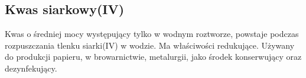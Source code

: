 \subsection{Kwas siarkowy(IV) }
Kwas o średniej mocy występujący tylko w wodnym roztworze, powstaje podczas rozpuszczania tlenku siarki(IV) w wodzie.
Ma właściwości redukujące.
Używany do produkcji papieru, w browarnictwie, metalurgii, jako środek konserwujący oraz dezynfekujący.
